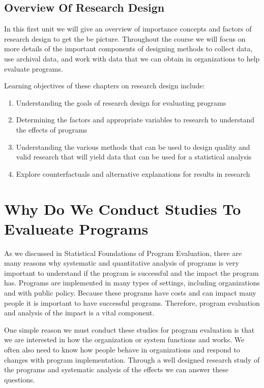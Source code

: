 \documentclass[]{book}
\providecommand{\tightlist}{%
  \setlength{\itemsep}{0pt}\setlength{\parskip}{0pt}}
\theoremstyle{definition}
\theoremstyle{definition}
\theoremstyle{definition}
\theoremstyle{remark}
\begin{document}
\hypertarget{overview-of-research-design}{%
\subsection{Overview Of Research
Design}\label{overview-of-research-design}}

In this first unit we will give an overview of importance concepts and
factors of research design to get the be picture. Throughout the course
we will focus on more details of the important components of designing
methods to collect data, use archival data, and work with data that we
can obtain in organizations to help evaluate programs.

Learning objectives of these chapters on research design include:

\begin{enumerate}
\def\labelenumi{\arabic{enumi}.}
\tightlist
\item
  Understanding the goals of research design for evaluating programs
\item
  Determining the factors and appropriate variables to research to
  understand the effects of programs
\item
  Understanding the various methods that can be used to design quality
  and valid research that will yield data that can be used for a
  statistical analysis
\item
  Explore counterfactuals and alternative explanations for results in
  research
\end{enumerate}

\hypertarget{why-do-we-conduct-studies-to-evalueate-programs}{%
\section{Why Do We Conduct Studies To Evalueate
Programs}\label{why-do-we-conduct-studies-to-evalueate-programs}}

As we discussed in Statistical Foundations of Program Evaluation, there
are many reasons why systematic and quantitative analysis of programs is
very important to understand if the program is successful and the impact
the program has. Programs are implemented in many types of settings,
including organizations and with public policy. Because these programs
have costs and can impact many people it is important to have successful
programs. Therefore, program evaluation and analysis of the impact is a
vital component.

One simple reason we must conduct these studies for program evaluation
is that we are interested in how the organization or system functions
and works. We often also need to know how people behave in organizations
and respond to changes with program implementation. Through a well
designed research study of the programs and systematic analysis of the
effects we can answer these questions.
\end{document}
